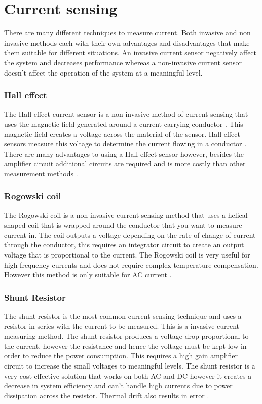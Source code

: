 \newpage
\section{Current sensing}\label{sec:cursens}
There are many different techniques to measure current. Both invasive and non invasive methods each with their own advantages and disadvantages that make them suitable for different situations. An invasive current sensor negatively affect the system and decreases performance whereas a non-invasive current sensor doesn't affect the operation of the system at a meaningful level. 

\subsubsection{Hall effect}\label{sec:cursens_hall}
The Hall effect current sensor is a non invasive method of current sensing that uses the magnetic field generated around a current carrying conductor \cite{CircuitDigest}. This magnetic field creates a voltage across the material of the sensor. Hall effect sensors measure this voltage to determine the current flowing in a conductor \cite{Hall}. There are many advantages to using a Hall effect sensor however, besides the amplifier circuit additional circuits are required and is more costly than other measurement methods \cite{CircuitDigest}.

\subsubsection{Rogowski coil}\label{sec:cursens_coil}
The Rogowski coil is a non invasive current sensing method that uses a helical shaped coil that is wrapped around the conductor that you want to measure current in. The coil outputs a voltage depending on the rate of change of current through the conductor, this requires an integrator circuit to create an output voltage that is proportional to the current. The Rogowski coil is very useful for high frequency currents and does not require complex temperature compensation. However this method is only suitable for AC current \cite{CircuitDigest}.

\subsubsection{Shunt Resistor}\label{sec:cursens_shunt}
The shunt resistor is the most common current sensing technique and uses a resistor in series with the current to be measured. This is a invasive current measuring method. The shunt resistor produces a voltage drop proportional to the current, however the resistance and hence the voltage must be kept low in order to reduce the power consumption. This requires a high gain amplifier circuit to increase the small voltages to meaningful levels. The shunt resistor is a very cost effective solution that works on both AC and DC however it creates a decrease in system efficiency and can't handle high currents due to power dissipation across the resistor. Thermal drift also results in error \cite{CircuitDigest}. 


